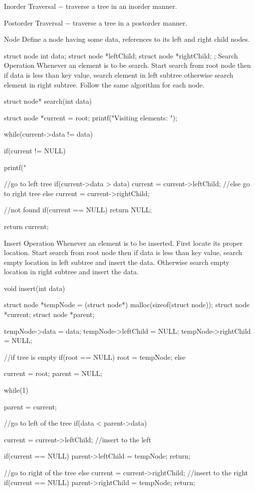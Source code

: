 \begin{frame}
\begin{frame}
Inorder Traversal − traverse a tree in an inorder manner.

Postorder Traversal − traverse a tree in a postorder manner.

Node
Define a node having some data, references to its left and right child nodes.

struct node {
   int data;   
   struct node *leftChild;
   struct node *rightChild;
};
Search Operation
Whenever an element is to be search. Start search from root node then if data is less than key value, search element in left subtree otherwise search element in right subtree. Follow the same algorithm for each node.

struct node* search(int data){
   struct node *current = root;
   printf("Visiting elements: ");
	
   while(current->data != data){
	
      if(current != NULL) {
         printf("%
			
         //go to left tree
         if(current->data > data){
            current = current->leftChild;
         }//else go to right tree
         else {                
            current = current->rightChild;
         }
			
         //not found
         if(current == NULL){
            return NULL;
         }
      }			
   }
   return current;
}
Insert Operation
Whenever an element is to be inserted. First locate its proper location. Start search from root node then if data is less than key value, search empty location in left subtree and insert the data. Otherwise search empty location in right subtree and insert the data.

void insert(int data){
   struct node *tempNode = (struct node*) malloc(sizeof(struct node));
   struct node *current;
   struct node *parent;

   tempNode->data = data;
   tempNode->leftChild = NULL;
   tempNode->rightChild = NULL;

   //if tree is empty
   if(root == NULL){
      root = tempNode;
   }else {
      current = root;
      parent = NULL;

      while(1){                
         parent = current;
			
         //go to left of the tree
         if(data < parent->data){
            current = current->leftChild;                
            //insert to the left
				
            if(current == NULL){
               parent->leftChild = tempNode;
               return;
            }
         }//go to right of the tree
         else{
            current = current->rightChild;
            //insert to the right
            if(current == NULL){
               parent->rightChild = tempNode;
               return;
            }
         }
      }            
   }
}        


\end{frame}
\end{frame}
